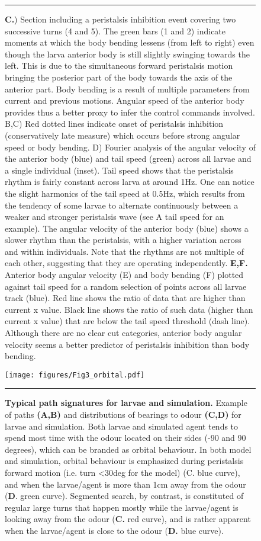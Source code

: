 \documentclass[10pt,a4paper]{article}
\begin{document}
\begin{figure}[t!]
\ContinuedFloat
\caption{
{\bf C.}) Section including a peristalsis inhibition event covering two successive turns (4 and 5). The green bars (1 and 2) indicate moments at which the body bending lessens (from left to right) even though the larva anterior body is still slightly swinging towards the left. This is due to the simultaneous forward peristalsis motion bringing the posterior part of the body towards the axis of the anterior part. Body bending is a result of multiple parameters from current and previous motions. Angular speed of the anterior body provides thus a better proxy to infer the control commands involved. B,C) Red dotted lines indicate onset of peristalsis inhibition (conservatively late measure) which occurs before strong angular speed or body bending. D) Fourier analysis of the angular velocity of the anterior body (blue) and tail speed (green) across all larvae and a single individual (inset). Tail speed shows that the peristalsis rhythm is fairly constant across larva at around 1Hz. One can notice the slight harmonics of the tail speed at 0.5Hz, which results from the tendency of some larvae to alternate continuously between a weaker and stronger peristalsis wave (see A tail speed for an example). The angular velocity of the anterior body (blue) shows a slower rhythm than the peristalsis, with a higher variation across and within individuals. Note that the rhythms are not multiple of each other, suggesting that they are operating independently.
{\bf  E,F.} Anterior body angular velocity (E) and body bending (F) plotted against tail speed for a random selection of points across all larvae track (blue). Red line shows the ratio of data that are higher than current x value. Black line shows the ratio of such data (higher than current x value) that are below the tail speed threshold (dash line). Although there are no clear cut categories, anterior body angular velocity seems a better predictor of peristalsis inhibition than body bending.
}
\hrule
\end{figure}


\begin{figure}[!ht]
\begin{center}
\texttt{[image: figures/Fig3\_orbital.pdf]}
\caption{{\bf Typical path signatures for larvae and simulation.} Example of paths {\bf (A,B)} and distributions of bearings to odour {\bf (C,D)} for larvae and simulation. Both larvae and simulated agent tends to spend most time with the odour located on their sides (-90 and 90 degrees), which can be branded as orbital behaviour. In both model and simulation, orbital behaviour is emphasized during peristalsis forward motion (i.e. turn <30deg for the model) (C. blue curve), and when the larvae/agent is more than 1cm away from the odour ({\bf D}. green curve). Segmented search, by contrast, is constituted of regular large turns that happen mostly while the larvae/agent is looking away from the odour ({\bf C.} red curve), and is rather apparent when the larvae/agent is close to the odour ({\bf D.} blue curve).
\label{fig:Fig3}}
\hrule
\end{center}
\end{figure}
\end{document}
